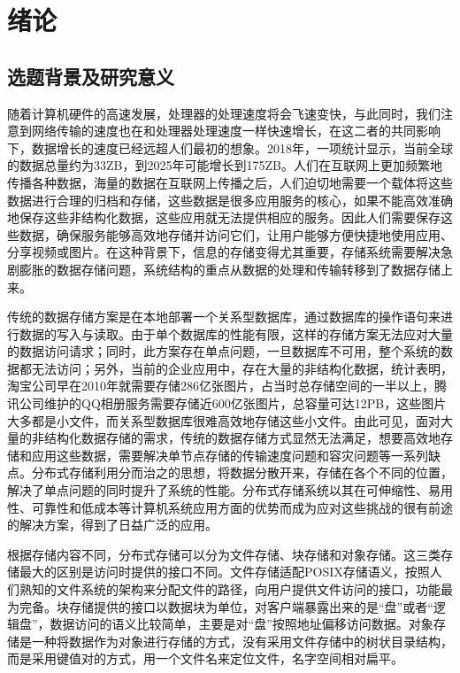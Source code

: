 
\chapter{绪论}

\section{选题背景及研究意义}%
随着计算机硬件的高速发展，处理器的处理速度将会飞速变快，与此同时，我们注意到网络传输的速度也在和处理器处理速度一样快速增长，在这二者的共同影响下，数据增长的速度已经远超人们最初的想象。2018年，一项统计显示，当前全球的数据总量约为33ZB，到2025年可能增长到175ZB\cite{2}。人们在互联网上更加频繁地传播各种数据，海量的数据在互联网上传播之后，人们迫切地需要一个载体将这些数据进行合理的归档和存储，这些数据是很多应用服务的核心，如果不能高效准确地保存这些非结构化数据，这些应用就无法提供相应的服务\cite{1}。因此人们需要保存这些数据，确保服务能够高效地存储并访问它们，让用户能够方便快捷地使用应用、分享视频或图片。在这种背景下，信息的存储变得尤其重要，存储系统需要解决急剧膨胀的数据存储问题，系统结构的重点从数据的处理和传输转移到了数据存储上来。

传统的数据存储方案是在本地部署一个关系型数据库，通过数据库的操作语句来进行数据的写入与读取。由于单个数据库的性能有限，这样的存储方案无法应对大量的数据访问请求；同时，此方案存在单点问题，一旦数据库不可用，整个系统的数据都无法访问；另外，当前的企业应用中，存在大量的非结构化数据，统计表明，淘宝公司早在2010年就需要存储286亿张图片\cite{3}，占当时总存储空间的一半以上，腾讯公司维护的QQ相册服务需要存储近600亿张图片，总容量可达12PB\cite{4}，这些图片大多都是小文件，而关系型数据库很难高效地存储这些小文件。由此可见，面对大量的非结构化数据存储的需求，传统的数据存储方式显然无法满足，想要高效地存储和应用这些数据，需要解决单节点存储的传输速度问题和容灾问题等一系列缺点\cite{5}。分布式存储利用分而治之的思想，将数据分散开来，存储在各个不同的位置，解决了单点问题的同时提升了系统的性能。分布式存储系统以其在可伸缩性、易用性、可靠性和低成本等计算机系统应用方面的优势而成为应对这些挑战的很有前途的解决方案，得到了日益广泛的应用\cite{6}。

根据存储内容不同，分布式存储可以分为文件存储、块存储和对象存储。这三类存储最大的区别是访问时提供的接口不同。文件存储适配POSIX存储语义，按照人们熟知的文件系统的架构来分配文件的路径，向用户提供文件访问的接口，功能最为完备。块存储提供的接口以数据块为单位，对客户端暴露出来的是“盘”或者“逻辑盘”，数据访问的语义比较简单，主要是对“盘”按照地址偏移访问数据。对象存储是一种将数据作为对象进行存储的方式，没有采用文件存储中的树状目录结构，而是采用键值对的方式，用一个文件名来定位文件，名字空间相对扁平。

